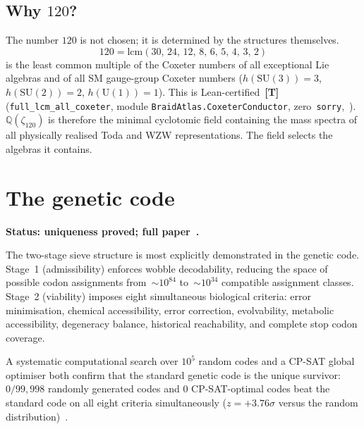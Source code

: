 \documentclass[11pt]{article}
\theoremstyle{remark}
\newcommand{\zetaN}[1]{\zeta_{#1}}
\newcommand{\lean}[1]{\texttt{#1}}
\begin{document}
\subsection{\texorpdfstring{Why $120$?}{Why 120?}}

The number $120$ is not chosen; it is determined by the structures themselves.
\begin{equation}
  120 = \mathrm{lcm}(30,\,24,\,12,\,8,\,6,\,5,\,4,\,3,\,2)
\end{equation}
is the least common multiple of the Coxeter numbers of all exceptional Lie algebras
and of all SM gauge-group Coxeter numbers
($h(\mathrm{SU}(3))=3$, $h(\mathrm{SU}(2))=2$, $h(\mathrm{U}(1))=1$).
This is Lean-certified~\textbf{[T]} (\lean{full\_lcm\_all\_coxeter},
module \lean{BraidAtlas.CoxeterConductor}, zero~\lean{sorry},~\cite{ugp-lean}).
$\mathbb{Q}(\zetaN{120})$ is therefore the minimal cyclotomic field containing
the mass spectra of all physically realised Toda and WZW representations.
The field selects the algebras it contains.


\section{The genetic code}
\label{sec:genetic}

\noindent\textbf{Status: uniqueness proved; full paper~\cite{SpivackGeneticCode}.}

The two-stage sieve structure is most explicitly demonstrated in the genetic code.
Stage~1 (admissibility) enforces wobble decodability, reducing the space of
possible codon assignments from~$\sim10^{84}$ to~$\sim10^{34}$ compatible
assignment classes.
Stage~2 (viability) imposes eight simultaneous biological criteria: error
minimisation, chemical accessibility, error correction, evolvability,
metabolic accessibility, degeneracy balance, historical reachability, and complete
stop codon coverage.

A systematic computational search over $10^5$ random codes
and a CP-SAT global optimiser both confirm that the standard genetic code is the
unique survivor: $0/99{,}998$ randomly generated codes and $0$ CP-SAT-optimal
codes beat the standard code on all eight criteria simultaneously
($z = +3.76\sigma$ versus the random distribution)~\cite{SpivackGeneticCode}.
\end{document}
